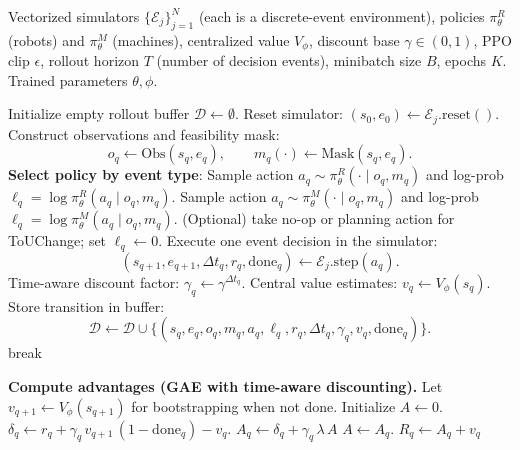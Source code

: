 \documentclass[preprint, 3p, review, 12pt]{elsarticle}
\begin{document}
\begin{algorithm}[t]
\caption{Event-driven Maskable PPO for JSSPT-Transport-ToU (Option B)}
\label{alg:maskableppo_smdp}
\begin{algorithmic}[1]
\Require
Vectorized simulators $\{\mathcal{E}_j\}_{j=1}^{N}$ (each is a discrete-event environment),
policies $\pi_{\theta}^{R}$ (robots) and $\pi_{\theta}^{M}$ (machines),
centralized value $V_{\phi}$, discount base $\gamma\in(0,1)$,
PPO clip $\epsilon$, rollout horizon $T$ (number of decision events), minibatch size $B$, epochs $K$.
\Ensure Trained parameters $\theta,\phi$.

    \State Initialize empty rollout buffer $\mathcal{D}\leftarrow \emptyset$.
        \State Reset simulator: $(s_0,e_0)\leftarrow \mathcal{E}_j.\mathrm{reset}()$.
            \State Construct observations and feasibility mask:
            \[
            o_q \leftarrow \mathrm{Obs}(s_q,e_q),\qquad
            m_q(\cdot)\leftarrow \mathrm{Mask}(s_q,e_q).
            \]
            \State \textbf{Select policy by event type}:
                \State Sample action $a_q \sim \pi_{\theta}^{R}(\cdot \mid o_q, m_q)$ and log-prob $\ell_q=\log \pi_{\theta}^{R}(a_q\mid o_q,m_q)$.
                \State Sample action $a_q \sim \pi_{\theta}^{M}(\cdot \mid o_q, m_q)$ and log-prob $\ell_q=\log \pi_{\theta}^{M}(a_q\mid o_q,m_q)$.
            \Else
                \State (Optional) take no-op or planning action for ToUChange; set $\ell_q\leftarrow 0$.
            \EndIf
            \State Execute one event decision in the simulator:
            \[
            (s_{q+1},e_{q+1},\Delta t_q,r_q,\mathrm{done}_q)\leftarrow \mathcal{E}_j.\mathrm{step}(a_q).
            \]
            \State Time-aware discount factor: $\gamma_q \leftarrow \gamma^{\Delta t_q}$.
            \State Central value estimates: $v_q\leftarrow V_{\phi}(s_q)$.
            \State Store transition in buffer:
            \[
            \mathcal{D}\leftarrow \mathcal{D}\cup \{(s_q,e_q,o_q,m_q,a_q,\ell_q,r_q,\Delta t_q,\gamma_q,v_q,\mathrm{done}_q)\}.
            \]
                \State break
            \EndIf
        \EndFor
    \EndFor

    \State \textbf{Compute advantages (GAE with time-aware discounting).}
    \State Let $v_{q+1}\leftarrow V_{\phi}(s_{q+1})$ for bootstrapping when not done.
        \State Initialize $A\leftarrow 0$.
            \State $\delta_q \leftarrow r_q + \gamma_q\, v_{q+1}\,(1-\mathrm{done}_q) - v_q$.
            \State $A_q \leftarrow \delta_q + \gamma_q\,\lambda\, A$ 
            \State $A \leftarrow A_q$.
            \State $R_q \leftarrow A_q + v_q$ 
        \EndFor
    \EndFor


\end{algorithmic}
\end{algorithm}
\end{document}
